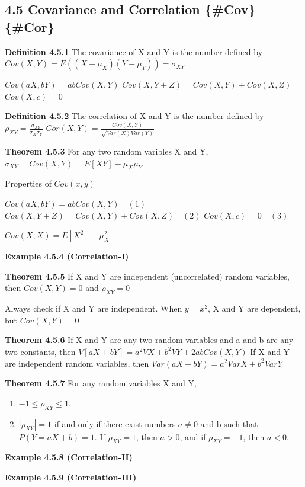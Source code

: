 \documentclass[10pt,twocolumn,portrait]{article}
\providecommand{\tightlist}{%
  \setlength{\itemsep}{0pt}\setlength{\parskip}{0pt}}
\begin{document}
\hypertarget{bNorm}{%
\subsection{4.5 Covariance and Correlation \{\#Cov\}
\{\#Cor\}}\label{bNorm}}

\textbf{Definition 4.5.1} The covariance of X and Y is the number
defined by \(Cov(X,Y)=E((X-\mu_X)(Y-\mu_Y))=\sigma_{XY}\)

\(Cov(aX,bY)=abCov(X,Y)\) \(Cov(X,Y+Z)=Cov(X,Y)+Cov(X,Z)\)
\(Cov(X,c)=0\)

\textbf{Definition 4.5.2} The correlation of X and Y is the number
defined by \(\rho_{XY}=\frac{\sigma_{XY}}{\sigma_X\sigma_Y}\)
\(Cor(X,Y)=\frac{Cov(X,Y)}{\sqrt{Var(X)Var(Y)}}\)

\textbf{Theorem 4.5.3} For any two random varibles X and Y,
\(\sigma_{XY}=Cov(X,Y)=E[XY]-\mu_X\mu_Y\)

Properties of \(Cov(x,y)\)

\(Cov(aX,bY)=abCov(X,Y)\quad (1)\)
\(Cov(X,Y+Z)=Cov(X,Y)+Cov(X,Z)\quad (2)\) \(Cov(X,c)=0\quad (3)\)

\(Cov(X,X)=E[X^2]-\mu_X^2\)

\textbf{Example 4.5.4 (Correlation-I)}

\textbf{Theorem 4.5.5} If X and Y are independent (uncorrelated) random
variables, then \(Cov(X,Y)=0\) and \(\rho_{XY}=0\)

Always check if X and Y are independent. When \(y=x^2\), X and Y are
dependent, but \(Cov(X,Y)=0\)

\textbf{Theorem 4.5.6} If X and Y are any two random variables and a and
b are any two constants, then \(V[aX\pm bY]=a^2VX+b^2VY\pm 2abCov(X,Y)\)
If X and Y are independent random variables, then
\(Var(aX+bY)=a^2VarX+b^2VarY\)

\textbf{Theorem 4.5.7} For any random variables X and Y,

\begin{enumerate}
\def\labelenumi{\alph{enumi}.}
\tightlist
\item
  \(-1\le \rho_{XY}\le1\).
\item
  \(|\rho_{XY}|=1\) if and only if there exist numbers \(a\neq0\) and b
  such that \(P(Y=aX+b)=1\). If \(\rho_{XY}=1\), then \(a>0\), and if
  \(\rho_{XY}=-1\), then \(a<0\).
\end{enumerate}

\textbf{Example 4.5.8 (Correlation-II)}

\textbf{Example 4.5.9 (Correlation-III)}
\end{document}
